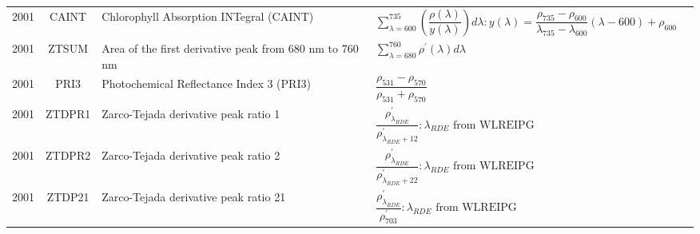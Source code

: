 \documentclass[10pt]{article}
\begin{document}
\begin{ThreePartTable}
\begin{longtable}{c c m{2.80in} M{2.80in} M{1.5in}}
  2001 & CAINT   & Chlorophyll Absorption INTegral (CAINT)                                        & $\sum\limits_{\lambda=600}^{735}\left(\dfrac{\rho(\lambda)}{y(\lambda)}\right)d\lambda : y(\lambda)=\dfrac{\rho_{735}-\rho_{600}}{\lambda_{735}-\lambda_{600}}(\lambda-600)+\rho_{600}$                                                                                                 & \citet{Oppelt2001,Oppelt2004}                       \\
  2001 & ZTSUM   & Area of the first derivative peak from 680 nm to 760 nm                        & $\sum\limits_{\lambda=680}^{760}\rho^\prime(\lambda)d\lambda$                                                                                                                                                                                                                           & \citet{Zarco-Tejada2001b}                           \\
  2001 & PRI3    & Photochemical Reflectance Index 3 (PRI3)                                       & $\dfrac{\rho_{531}-\rho_{570}}{\rho_{531}+\rho_{570}}$                                                                                                                                                                                                                                  & \citet{Zarco-Tejada2001b}                                 \\
  2001 & ZTDPR1  & Zarco-Tejada derivative peak ratio 1                                           & $\dfrac{\rho^\prime_{\lambda_{RDE}}}{\rho^\prime_{\lambda_{RDE}+12}} : \lambda_{RDE} \text{ from WLREIPG}$                                                                                                                                                                              & \citet{Zarco-Tejada2001b,Miller1990}                \\
  2001 & ZTDPR2  & Zarco-Tejada derivative peak ratio 2                                           & $\dfrac{\rho^\prime_{\lambda_{RDE}}}{\rho^\prime_{\lambda_{RDE}+22}} : \lambda_{RDE} \text{ from WLREIPG}$                                                                                                                                                                              & \citet{Zarco-Tejada2001b,Miller1990}                \\
  2001 & ZTDP21  & Zarco-Tejada derivative peak ratio 21                                          & $\dfrac{\rho^\prime_{\lambda_{RDE}}}{\rho^\prime_{703}} : \lambda_{RDE} \text{ from WLREIPG}$                                                                                                                                                                                           & \citet{Zarco-Tejada2001b,Miller1990}                \\

\end{longtable}
\end{ThreePartTable}
\end{document}
